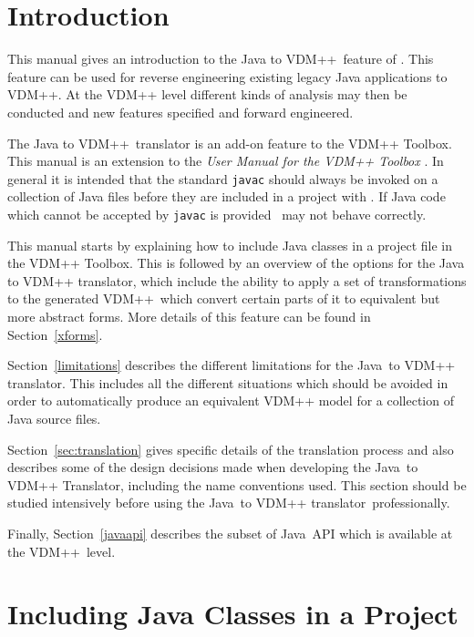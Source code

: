 \documentclass[\pformat,12pt]{article}
\newcommand{\vdmslpp}{VDM++}
\newcommand{\ToolboxName}{VDM++ Toolbox}
\newcommand{\JAVA}{Java}
\newcommand{\tjTov}{the \JAVA\ to VDM++ translator}
\newcommand{\VDM}{VDM++}
\newcommand{\jTov}{\JAVA\ to VDM++ Translator}
\begin{document}
\vdmtoolsmanualscsk{The Java to \vdmslpp\ User Manual}{2.0}
 

\section{Introduction} \label{sec:introduction}

This manual gives an introduction to the Java to \vdmslpp\ feature
of \VDMTools. This feature can be used for reverse
engineering existing legacy Java applications to VDM++. At the VDM++
level different kinds of analysis may then be conducted and new
features specified and forward engineered.

The Java to \vdmslpp\ translator is an add-on feature to the
\ToolboxName{}. This manual is an extension to the {\em User Manual
  for the VDM++ Toolbox} \cite{UserManPP-SCSK}. In general it is
intended that the standard \texttt{javac} should always be invoked on
a collection of Java files 
before they are included in a project with \VDMTools. If Java code
which cannot be accepted by \texttt{javac} is provided \VDMTools\ may
not behave correctly.

This manual starts by explaining how to include Java classes in a
project file in the \ToolboxName{}. This is followed by an overview of the
options for the Java to VDM++ translator, which include the ability to
apply a set of transformations to the generated \vdmslpp\ which
convert certain parts of it to equivalent but more abstract
forms. More details of this feature can be found in Section~\ref{xforms}.

Section~\ref{limitations} describes the different limitations for \tjTov{}.
This includes all the different situations which should be
avoided in order to automatically produce an equivalent VDM++ model
for a collection of Java source files.

Section~\ref{sec:translation}  gives specific details of the
translation process and also describes some of the design decisions
made when developing the \jTov{}, including the name conventions
used. This section should be studied intensively before using \tjTov\ 
professionally.

Finally, Section~\ref{javaapi} describes the subset of \JAVA\ API
which is available at the \VDM\ level. 

\section{Including Java Classes in a Project}
\end{document}
